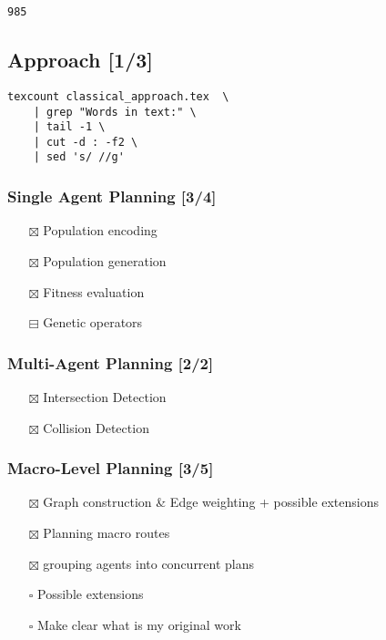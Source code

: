 \documentclass[11pt]{article}
\begin{document}
\begin{verbatim}
985
\end{verbatim}

\subsection{{\bfseries\sffamily [-]} Approach [1/3]}
\label{sec:org862b8ce}
\begin{verbatim}
texcount classical_approach.tex  \
    | grep "Words in text:" \
    | tail -1 \
    | cut -d : -f2 \
    | sed 's/ //g'
\end{verbatim}
\subsubsection{{\bfseries\sffamily [ ]} Single Agent Planning [3/4]}
\label{sec:org4d6310e}
\begin{itemize}
\item[{$\boxtimes$}] Population encoding
\item[{$\boxtimes$}] Population generation
\item[{$\boxtimes$}] Fitness evaluation
\item[{$\boxminus$}] Genetic operators
\end{itemize}
\subsubsection{{\bfseries\sffamily [X]} Multi-Agent Planning [2/2]}
\label{sec:org9928b75}
\begin{itemize}
\item[{$\boxtimes$}] Intersection Detection
\item[{$\boxtimes$}] Collision Detection
\end{itemize}
\subsubsection{{\bfseries\sffamily [ ]} Macro-Level Planning [3/5]}
\label{sec:org8f381f2}
\begin{itemize}
\item[{$\boxtimes$}] Graph construction \& Edge weighting + possible extensions
\item[{$\boxtimes$}] Planning macro routes
\item[{$\boxtimes$}] grouping agents into concurrent plans
\item[{$\square$}] Possible extensions
\item[{$\square$}] Make clear what is my original work
\end{itemize}
\end{document}
